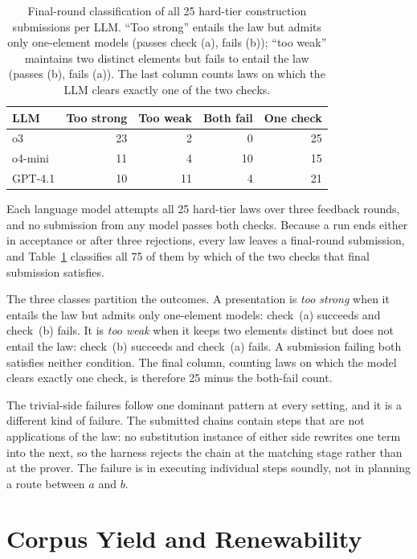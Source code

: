 \documentclass[letterpaper]{article}
\begin{document}
\begin{table}[t]
\centering
\begin{tabular}{@{}lrrrr@{}}
\toprule
LLM & Too strong & Too weak & Both fail & One check \\
\midrule
o3      & 23 & 2  & 0  & 25 \\
o4-mini & 11 & 4  & 10 & 15 \\
GPT-4.1 & 10 & 11 & 4  & 21 \\
\bottomrule
\end{tabular}
\caption{Final-round classification of all 25 hard-tier construction
submissions per LLM. ``Too strong'' entails the law but admits only
one-element models (passes check (a), fails (b)); ``too weak'' maintains two
distinct elements but fails to entail the law (passes (b), fails (a)). The last
column counts laws on which the LLM clears exactly one of the two checks.}
\label{tab:failures}
\end{table}

Each language model attempts all 25 hard-tier laws over three feedback rounds,
and no submission from any model passes both checks. Because a run ends either
in acceptance or after three rejections, every law leaves a final-round
submission, and Table~\ref{tab:failures} classifies all 75 of them by which of
the two checks that final submission satisfies.

The three classes partition the outcomes. A presentation is \emph{too strong}
when it entails the law but admits only one-element models: check~(a) succeeds
and check~(b) fails. It is \emph{too weak} when it keeps two elements distinct
but does not entail the law: check~(b) succeeds and check~(a) fails. A
submission failing both satisfies neither condition. The final column, counting
laws on which the model clears exactly one check, is therefore 25 minus the
both-fail count.

The trivial-side failures follow one dominant pattern at every setting, and it
is a different kind of failure. The submitted chains contain steps that are not
applications of the law: no substitution instance of either side rewrites one
term into the next, so the harness rejects the chain at the matching stage
rather than at the prover. The failure is in executing individual steps
soundly, not in planning a route between $a$ and $b$.

\section{Corpus Yield and Renewability}
\label{app:renew}
\end{document}
